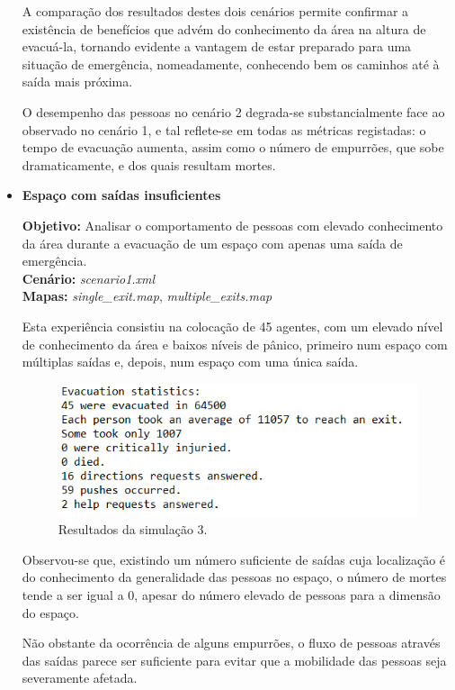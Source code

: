 \documentclass[12pt]{article}
\begin{document}
\begin{titlepage}
\begin{itemize}
A comparação dos resultados destes dois cenários permite confirmar a existência de benefícios que advém do conhecimento da área na altura de evacuá-la, tornando evidente a vantagem de estar preparado para uma situação de emergência, nomeadamente, conhecendo bem os caminhos até à saída mais próxima.

O desempenho das pessoas no cenário 2 degrada-se substancialmente face ao observado no cenário 1, e tal reflete-se em todas as métricas registadas: o tempo de evacuação aumenta, assim como o número de empurrões, que sobe dramaticamente, e dos quais resultam mortes.

\item \textbf{Espaço com saídas insuficientes}

\textbf{Objetivo:} 
Analisar o comportamento de pessoas com elevado conhecimento da área durante a evacuação de um espaço com apenas uma saída de emergência.
\\\textbf{Cenário:} 
\textit{scenario1.xml}
\\\textbf{Mapas:} 
\textit{single\_exit.map}, \textit{multiple\_exits.map}
\newline

Esta experiência consistiu na colocação de 45 agentes, com um elevado nível de conhecimento da área e baixos níveis de pânico, primeiro num espaço com múltiplas saídas e, depois, num espaço com uma única saída.

\begin{figure}[H]
	\centering
	\includegraphics{log_sc3.png}
	\caption{Resultados da simulação 3.}
	\label{log_sc3}
\end{figure}

Observou-se que, existindo um número suficiente de saídas cuja localização é do conhecimento da generalidade das pessoas no espaço, o número de mortes tende a ser igual a 0, apesar do número elevado de pessoas para a dimensão do espaço. 

Não obstante da ocorrência de alguns empurrões, o fluxo de pessoas através das saídas parece ser suficiente para evitar que a mobilidade das pessoas seja severamente afetada.


\end{itemize}
\end{titlepage}
\end{document}

